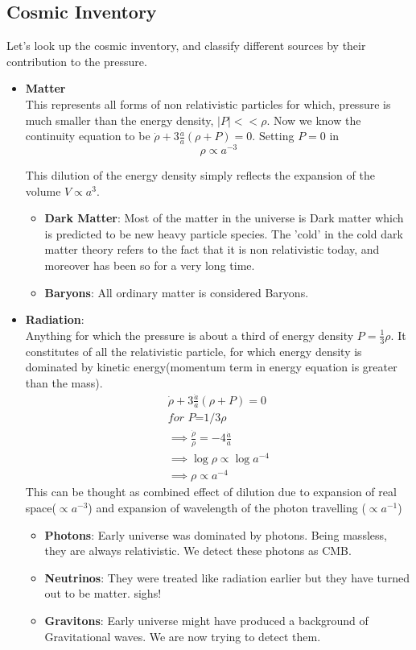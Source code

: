 \documentclass[12pt]{report}
\newcommand{\tbf}[1]{\textbf{#1}}
\newcommand{\tit}[1]{\textit{#1}}
\begin{document}
\subsection*{Cosmic Inventory}
Let's look up the cosmic inventory, and classify different sources by their contribution to the pressure.
\begin{itemize}
\item \textbf{Matter} \\
This represents all forms of non relativistic particles for which, pressure is much smaller than the energy density, $|P|<< \rho $. Now we know the continuity equation to be $\dot{\rho}+ 3 \frac{\dot{a}}{a}(\rho + P) = 0$. Setting $P=0$ in
\begin{equation*}
\rho \propto a^{-3}
\end{equation*}

This dilution of the energy density simply reflects the expansion of the volume $V \propto a^3$.

\begin{itemize}
\item \textbf{Dark Matter}: Most of the matter in the universe is Dark matter which is predicted to be new heavy particle species. The 'cold' in the cold dark matter theory refers to the fact that it is non relativistic today, and moreover has been so for a very long time.\\ 
\item \textbf{Baryons}: All ordinary matter is considered Baryons.
\end{itemize}
\item \textbf{Radiation}:\\
 Anything for which the pressure is about a third of energy density $P=\frac{1}{3}\rho$. It constitutes of all the relativistic particle, for which energy density is dominated by kinetic energy(momentum term in energy equation is greater than the mass).
 \begin{eqnarray*}
 \dot{\rho}+3\frac{\dot{a}}{a}(\rho +P)=0\\
 \tit{for P=$1/3\rho$}\\
 \implies \frac{\dot{\rho}}{\rho}=-4\frac{\dot{a}}{a}\\
 \implies \log \rho \propto \log a^{-4}\\
\implies \rho \propto a^{-4}
 \end{eqnarray*}
 This can be thought as combined effect of  dilution due to expansion of real space($\propto a^{-3}$) and expansion of wavelength of the photon travelling ($\propto a^{-1}$)  
 \begin{itemize}
 \item \tbf{Photons}: Early universe was dominated by photons. Being massless, they are always relativistic. We detect these photons as CMB.
 \item \tbf{Neutrinos}: They were treated like radiation earlier but they have turned out to  be matter. sighs!
 \item \tbf{Gravitons}: Early universe might have produced a background of Gravitational waves. We are now trying to detect them.
 \end{itemize}
 

\end{itemize}
\end{document}
